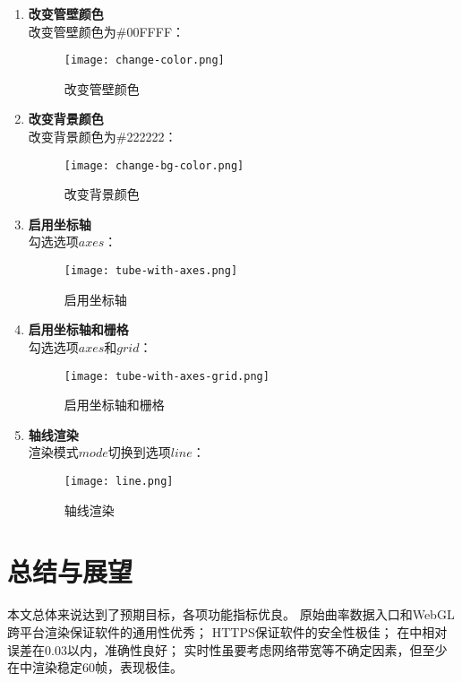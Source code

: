 \begin{enumerate}

\item \textbf{改变管壁颜色} \\
改变管壁颜色为\#00FFFF：
\begin{figure}[H]
\centering
\texttt{[image: change-color.png]}
\caption{改变管壁颜色}
\label{fig:change-color}
\end{figure}

\item \textbf{改变背景颜色} \\
改变背景颜色为\#222222：

\begin{figure}[H]
\centering
\texttt{[image: change-bg-color.png]}
\caption{改变背景颜色}
\label{fig:change-bg-color}
\end{figure}

\item \textbf{启用坐标轴} \\
勾选选项$axes$：

\begin{figure}[H]
\centering
\texttt{[image: tube-with-axes.png]}
\caption{启用坐标轴}
\label{fig:tube-with-axes}
\end{figure}

\item \textbf{启用坐标轴和栅格} \\
勾选选项$axes$和$grid$：

\begin{figure}[H]
\centering
\texttt{[image: tube-with-axes-grid.png]}
\caption{启用坐标轴和栅格}
\label{fig:tube-with-axes-grid}
\end{figure}

\item \textbf{轴线渲染} \\
渲染模式$mode$切换到选项$line$：

\begin{figure}[H]
\centering
\texttt{[image: line.png]}
\caption{轴线渲染}
\label{fig:line}
\end{figure}

\end{enumerate}

\clearpage

\section{总结与展望}
本文总体来说达到了预期目标，各项功能指标优良。
原始曲率数据入口和WebGL跨平台渲染保证软件的通用性优秀；
HTTPS保证软件的安全性极佳；
在中相对误差在$0.03$以内，准确性良好；
实时性虽要考虑网络带宽等不确定因素，但至少在中渲染稳定60帧，表现极佳。

